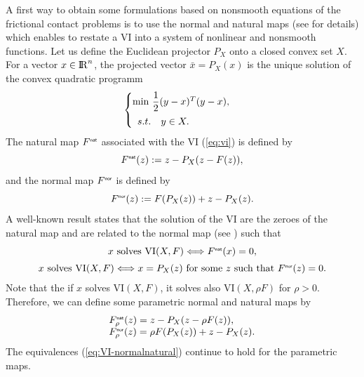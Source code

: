 A first way to obtain some formulations based on nonsmooth equations of the frictional contact problems is to use the normal and natural maps (see \cite{Facchinei.Pang2003} for details) which enables to restate a VI into a system of nonlinear and  nonsmooth functions.  Let us define the Euclidean projector $P_X$ onto a closed convex set  $X$. For a vector $x\in \mathrm{I\!R}^n$, the projected vector $\bar x  = P_X(x)$ is the unique solution of the convex quadratic programm
\begin{equation}
  \label{eq:opt-proj}
  \begin{cases}
    \min\, \Frac 1 2 (y-x)^T(y-x), \\[2mm]
    \begin{array}{ll}
    s.t. & y \in X .
  \end{array}
  \end{cases}
\end{equation}
 The natural map $F^{\hbox{\sf \tiny{nat}}}$ associated with the VI (\ref{eq:vi}) is defined by
\begin{equation}
  \label{eq:naturalmap}
  F^\nat(z) := z - P_{X}(z-F(z)),
\end{equation}
and  the normal map $F^{\hbox{\sf \tiny{nor}}}$ is defined by
\begin{equation}
  \label{eq:normalmap}
  F^\nor(z) := F(P_X(z)) + z - P_{X}(z).
\end{equation}
A well-known result states that the solution of the VI are  the zeroes of the natural map and are related to the normal map (see \cite{Facchinei.Pang2003}) such that
\begin{equation}
  \label{eq:VI-normalnatural}
  \begin{array}{c}
  x \text{ solves } \mathrm{VI}(X,F) \Longleftrightarrow  F^\nat(x)=0, \\[2mm]
  x \text{ solves } \mathrm{VI}(X,F) \Longleftrightarrow x= P_X(z) \text{ for some } z \text{ such that } F^\nor(z)=0.
\end{array}
\end{equation}
Note that the if $x$ solves  $\mathrm{VI}(X,F)$, it solves also  $\mathrm{VI}(X,\rho F)$ for $\rho > 0$. Therefore, we can define some parametric normal and natural maps by
\begin{equation}
  \label{eq:parametrized-naturalnormalmap}
  \begin{array}{l}
    F_\rho^\nat(z) = z - P_{X}(z-\rho F(z)), \\
    F_\rho^\nor(z) = \rho F(P_X(z)) + z - P_{X}(z).
  \end{array}
\end{equation}
The equivalences (\ref{eq:VI-normalnatural}) continue to hold for the parametric maps. 
 

